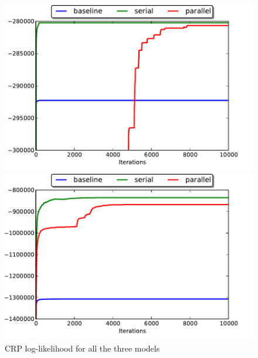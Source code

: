 \begin{figure}[ht]
\begin{minipage}[b]{0.45\linewidth}
\centering
\includegraphics[width=\textwidth]{fig/ru_crp_lls}
\end{minipage}
\hspace{0.5cm}
\begin{minipage}[b]{0.45\linewidth}
\centering
\includegraphics[width=\textwidth]{fig/en_crp_lls}
\end{minipage}
\caption{\label{fig:crpll} CRP log-likelihood for all the three models}
\end{figure}


